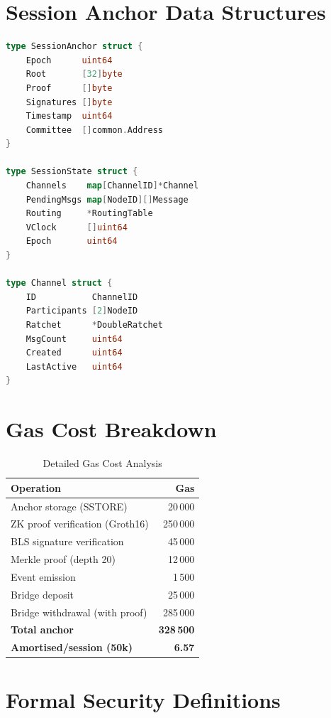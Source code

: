 \documentclass[11pt,a4paper]{article}
\begin{document}
\appendix

\section{Session Anchor Data Structures}
\label{app:data-structures}

\begin{lstlisting}[language=Go,caption={Core Data Structures}]
type SessionAnchor struct {
    Epoch      uint64
    Root       [32]byte
    Proof      []byte
    Signatures []byte
    Timestamp  uint64
    Committee  []common.Address
}

type SessionState struct {
    Channels    map[ChannelID]*Channel
    PendingMsgs map[NodeID][]Message
    Routing     *RoutingTable
    VClock      []uint64
    Epoch       uint64
}

type Channel struct {
    ID           ChannelID
    Participants [2]NodeID
    Ratchet      *DoubleRatchet
    MsgCount     uint64
    Created      uint64
    LastActive   uint64
}
\end{lstlisting}

\section{Gas Cost Breakdown}
\label{app:gas-costs}

\begin{table}[h]
\centering
\caption{Detailed Gas Cost Analysis}
\begin{tabular}{@{}lr@{}}
\toprule
\textbf{Operation} & \textbf{Gas} \\
\midrule
Anchor storage (SSTORE)       & 20\,000 \\
ZK proof verification (Groth16) & 250\,000 \\
BLS signature verification    & 45\,000 \\
Merkle proof (depth 20)       & 12\,000 \\
Event emission                & 1\,500 \\
Bridge deposit                & 25\,000 \\
Bridge withdrawal (with proof)& 285\,000 \\
\midrule
\textbf{Total anchor}         & \textbf{328\,500} \\
\textbf{Amortised/session (50k)} & \textbf{6.57} \\
\bottomrule
\end{tabular}
\end{table}

\section{Formal Security Definitions}
\label{app:security-defs}
\end{document}
